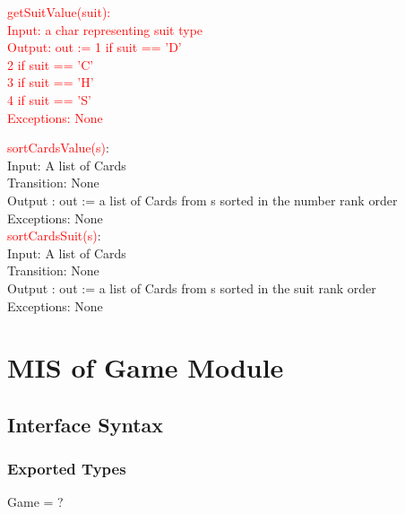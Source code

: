 \documentclass[12pt, titlepage]{article}
\begin{document}
\noindent \textcolor{red}{getSuitValue(suit):\\
Input: a char representing suit type\\
Output: out := 1 if suit == 'D'\\
2 if suit == 'C'\\
3 if suit == 'H'\\
4 if suit == 'S'\\
Exceptions: None\\}

\noindent \textcolor{red}{sortCardsValue(s)}:\\
Input: A list of Cards\\
Transition: None\\
Output : out := a list of Cards from s sorted in the number rank order\\
Exceptions: None\\

\noindent \textcolor{red}{sortCardsSuit(s)}:\\
Input: A list of Cards\\
Transition: None\\
Output : out := a list of Cards from s sorted in the suit rank order\\
Exceptions: None\\
\section{MIS of Game Module}
\subsection{Interface Syntax}
\subsubsection{Exported Types}
Game = ?
\end{document}

